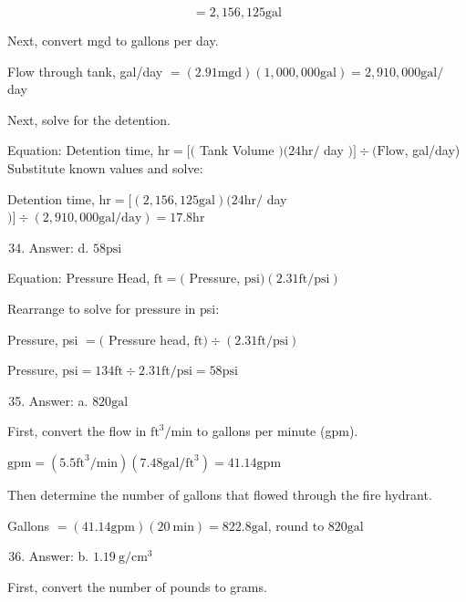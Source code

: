 \documentclass[10pt]{article}
\begin{document}
$$
=2,156,125 \mathrm{gal}
$$

Next, convert mgd to gallons per day.

Flow through tank, gal/day $=(2.91 \mathrm{mgd})(1,000,000 \mathrm{gal})=2,910,000 \mathrm{gal} /$ day

Next, solve for the detention.

Equation: Detention time, $\mathrm{hr}=[($ Tank Volume $)(24 \mathrm{hr} /$ day $)] \div(\mathrm{Flow}$, gal/day) Substitute known values and solve:

Detention time, $\mathrm{hr}=[(2,156,125 \mathrm{gal})(24 \mathrm{hr} /$ day $)] \div(2,910,000 \mathrm{gal} / \mathrm{day})=17.8 \mathrm{hr}$

\begin{enumerate}
  \setcounter{enumi}{33}
  \item Answer: d. $58 \mathrm{psi}$
\end{enumerate}

Equation: Pressure Head, $\mathrm{ft}=($ Pressure, $\mathrm{psi})(2.31 \mathrm{ft} / \mathrm{psi})$

Rearrange to solve for pressure in psi:

Pressure, psi $=($ Pressure head, $\mathrm{ft}) \div(2.31 \mathrm{ft} / \mathrm{psi})$

Pressure, $\mathrm{psi}=134 \mathrm{ft} \div 2.31 \mathrm{ft} / \mathrm{psi}=58 \mathrm{psi}$

\begin{enumerate}
  \setcounter{enumi}{34}
  \item Answer: a. $820 \mathrm{gal}$
\end{enumerate}

First, convert the flow in $\mathrm{ft}^{3} / \mathrm{min}$ to gallons per minute (gpm).

$\mathrm{gpm}=\left(5.5 \mathrm{ft}^{3} / \mathrm{min}\right)\left(7.48 \mathrm{gal} / \mathrm{ft}^{3}\right)=41.14 \mathrm{gpm}$

Then determine the number of gallons that flowed through the fire hydrant.

Gallons $=(41.14 \mathrm{gpm})(20 \mathrm{~min})=822.8 \mathrm{gal}$, round to $820 \mathrm{gal}$

\begin{enumerate}
  \setcounter{enumi}{35}
  \item Answer: b. $1.19 \mathrm{~g} / \mathrm{cm}^{3}$
\end{enumerate}

First, convert the number of pounds to grams.
\end{document}
